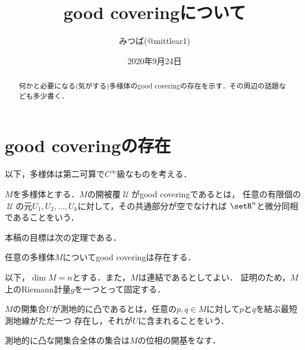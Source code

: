 \documentclass[uplatex]{jsarticle}
\title{good coveringについて}
\author{みつば(@mittlear1)}
\date{2020年9月24日}
\begin{document}
\maketitle
\begin{abstract}
    何かと必要になる(気がする)多様体のgood coveringの存在を示す．その周辺の話題なども多少書く．
\end{abstract}

\section{good coveringの存在}
以下，多様体は第二可算で$C^\infty$級なものを考える．


\begin{definition}
  $M$を多様体とする．$M$の開被覆$\mscrU$がgood coveringであるとは，
  任意の有限個の$\mscrU$の元$U_1,U_2,\dots,U_k$に対して，その共通部分が空でなければ
  $\setR^n$と微分同相であることをいう．
\end{definition}

本稿の目標は次の定理である．

\begin{theorem}\label{main}
  任意の多様体$M$についてgood coveringは存在する．
\end{theorem}

以下，$\dim M = n$とする．また，$M$は連結であるとしてよい．
証明のため，$M$上のRiemann計量$g$を一つとって固定する．

\begin{definition}
  $M$の開集合$U$が測地的に凸であるとは，任意の$p, q \in M$に対して$p$と$q$を結ぶ最短測地線がただ一つ
  存在し，それが$U$に含まれることをいう．
\end{definition}

\begin{proposition}\label{existence}
  測地的に凸な開集合全体の集合は$M$の位相の開基をなす．
\end{proposition}
\end{document}
